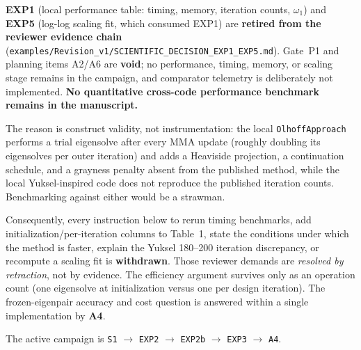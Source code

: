 \documentclass[12pt,a4paper]{article}
\begin{document}
\begin{tcolorbox}[colback=red!6,colframe=black,title={Performance-evidence policy (13 July 2026) --- supersedes every timing, speedup, and scaling item below}]
\textbf{EXP1} (local performance table: timing, memory, iteration counts,
$\omega_1$) and \textbf{EXP5} (log-log scaling fit, which consumed EXP1) are
\textbf{retired from the reviewer evidence chain}
(\texttt{examples/Revision\_v1/SCIENTIFIC\_DECISION\_EXP1\_EXP5.md}).  Gate~P1 and
planning items A2/A6 are \textbf{void}; no performance, timing, memory, or
scaling stage remains in the campaign, and comparator telemetry is deliberately
not implemented.  \textbf{No quantitative cross-code performance benchmark
remains in the manuscript.}

The reason is construct validity, not instrumentation: the local
\texttt{OlhoffApproach} performs a trial eigensolve after every MMA update
(roughly doubling its eigensolves per outer iteration) and adds a Heaviside
projection, a continuation schedule, and a grayness penalty absent from the
published method, while the local Yuksel-inspired code does not reproduce the
published iteration counts.  Benchmarking against either would be a strawman.

Consequently, every instruction below to rerun timing benchmarks, add
initialization/per-iteration columns to Table~1, state the conditions under which
the method is faster, explain the Yuksel 180--200 iteration discrepancy, or
recompute a scaling fit is \textbf{withdrawn}.  Those reviewer demands are
\emph{resolved by retraction}, not by evidence.  The efficiency argument survives
only as an operation count (one eigensolve at initialization versus one per design
iteration).  The frozen-eigenpair accuracy and cost question is answered
within a single implementation by \textbf{A4}.

The active campaign is \texttt{S1} $\to$ \texttt{EXP2} $\to$ \texttt{EXP2b} $\to$
\texttt{EXP3} $\to$ \texttt{A4}.
\end{tcolorbox}
\end{document}
